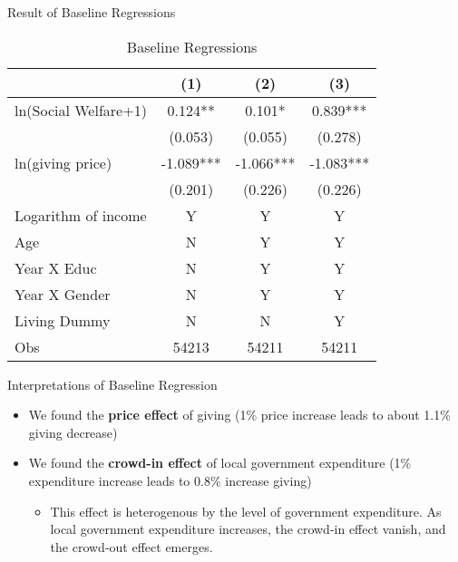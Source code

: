 \documentclass[
  ignorenonframetext,
]{beamer}
\providecommand{\tightlist}{%
  \setlength{\itemsep}{0pt}\setlength{\parskip}{0pt}}
\begin{document}
\begin{frame}{Result of Baseline Regressions}
\protect\hypertarget{result-of-baseline-regressions}{}
\begin{table}

\caption{\label{tab:kableTabBaseReg}Baseline Regressions}
\centering
\begin{tabular}[t]{lccc}
\toprule
 & (1) & (2) & (3)\\
\midrule
ln(Social Welfare+1) & 0.124** & 0.101* & 0.839***\\
 & (0.053) & (0.055) & (0.278)\\
ln(giving price) & -1.089*** & -1.066*** & -1.083***\\
 & (0.201) & (0.226) & (0.226)\\
Logarithm of income & Y & Y & Y\\
Age & N & Y & Y\\
Year X Educ & N & Y & Y\\
Year X Gender & N & Y & Y\\
Living Dummy & N & N & Y\\
Obs & 54213 & 54211 & 54211\\
\bottomrule
\end{tabular}
\end{table}
\end{frame}

\begin{frame}{Interpretations of Baseline Regression}
\protect\hypertarget{interpretations-of-baseline-regression}{}
\begin{itemize}
\tightlist
\item
  We found the \textbf{price effect} of giving (1\% price increase leads
  to about 1.1\% giving decrease)
\item
  We found the \textbf{crowd-in effect} of local government expenditure
  (1\% expenditure increase leads to 0.8\% increase giving)

  \begin{itemize}
  \tightlist
  \item
    This effect is heterogenous by the level of government expenditure.
    As local government expenditure increases, the crowd-in effect
    vanish, and the crowd-out effect emerges.
  \end{itemize}
\end{itemize}
\end{frame}
\end{document}
